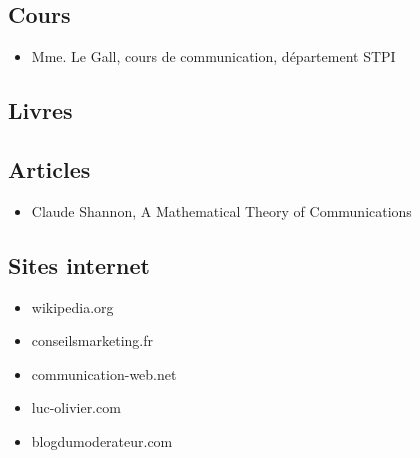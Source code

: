 \subsection{Cours}
\begin{itemize}
	\item Mme. Le Gall, cours de communication, département STPI
\end{itemize}
\subsection{Livres}
\subsection{Articles}
\begin{itemize}
	\item Claude Shannon, A Mathematical Theory of Communications
\end{itemize}
\subsection{Sites internet}
\begin{itemize}
\item wikipedia.org
\item conseilsmarketing.fr
\item communication-web.net
\item luc-olivier.com
\item blogdumoderateur.com
\end{itemize}


